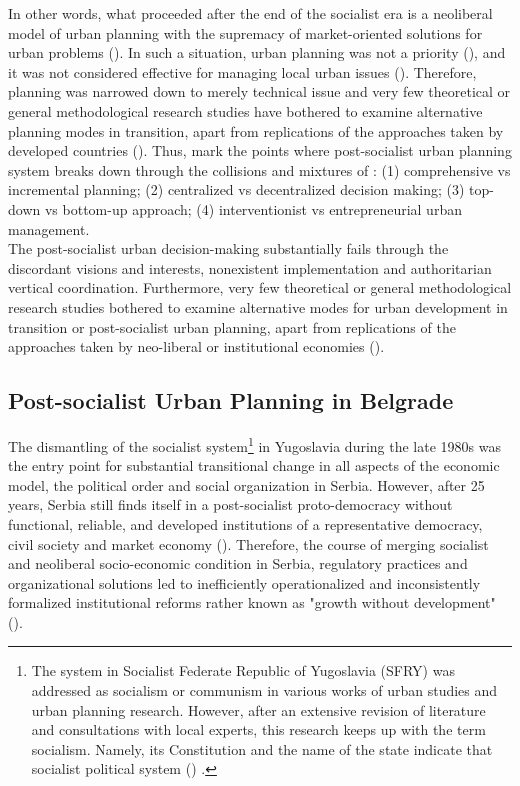 \documentclass[11pt]{report}
\begin{document}
In other words, what proceeded after the end of the socialist era is a neoliberal model of urban planning with the supremacy of market-oriented solutions for urban problems (\href{Sager}{\citealt{sager_neo-liberal_2011}}).
In such a situation, urban planning was not a priority (\href{Sykora}{\citealt{sykora_transitional_1999}}), and it was not considered effective for managing local urban issues (\citealt{Maier, 1998}\href{Vujosevic}{\citealt{vujosevic_planning_2006}}).
Therefore, planning was narrowed down to merely technical issue and very few theoretical or general methodological research studies have bothered to examine alternative planning modes in transition, apart from replications of the approaches taken by developed countries (\href{Begovic}{\citealt{begovic_ekonomika_1995}}).
Thus, \href{Zekovic}{\citealt{zekovic_spatial_2015}} mark the points where post-socialist urban planning system breaks down through the collisions and mixtures of :
(1) comprehensive vs incremental planning; 
(2) centralized vs decentralized decision making;
(3) top-down vs bottom-up approach;
(4) interventionist vs entrepreneurial urban management.
\\

The post-socialist urban decision-making substantially fails through the discordant visions and interests, nonexistent implementation and authoritarian vertical coordination.
Furthermore, very few theoretical or general methodological research studies bothered to examine alternative  modes  for  urban  development  in  transition or post-socialist urban planning,  apart  from  replications  of  the  approaches  taken  by  neo-liberal  or institutional economies (\href{Tsenkova}{\citealt{tsenkova_urban_2007}}).

\subsection{Post-socialist Urban Planning in Belgrade}

The  dismantling  of  the  socialist system\footnote{The system in Socialist Federate Republic of Yugoslavia (SFRY) was addressed as socialism or communism in various works of urban studies and urban planning research.
However, after an extensive revision of literature and consultations with local experts, this research keeps up with the term socialism. Namely, its Constitution and the name of the state indicate that socialist political system (\citealt{ref constitution})
.}
in Yugoslavia during the late 1980s was the entry point for substantial transitional change in all aspects of the economic model, the political order and social organization in Serbia. 
However, after 25 years, Serbia still finds itself in a post-socialist proto-democracy without functional, reliable, and developed institutions of a representative 
democracy, civil society and market economy (\href{Vujosevic}{\citealt{vujosevic_postsocijalisticka_2010}}). 
Therefore, the course of merging socialist and neoliberal socio-economic condition in Serbia, regulatory practices and organizational solutions led to inefficiently operationalized and inconsistently formalized institutional reforms rather known as "growth without development" (\href{ref}{\citealt{vujosevic_collapse_2010}}).
\\
\end{document}

